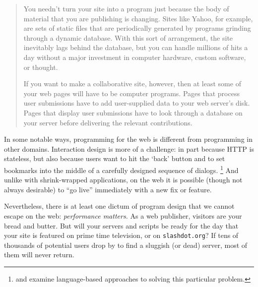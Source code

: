 \documentclass[preprint]{acm_proc_article-sp}
\begin{document}
\begin{quote}
  You needn’t turn your site into a program just because the
  body of material that you are publishing is changing.
  Sites like Yahoo, for example, are sets of static files
  that are periodically generated by programs grinding
  through a dynamic database.  With this sort of
  arrangement, the site inevitably lags behind the database,
  but you can handle millions of hits a day without a major
  investment in computer hardware, custom software, or
  thought.\par If you want to make a collaborative site,
  however, then at least some of your web pages will have to
  be computer programs.  Pages that process user submissions
  have to add user-supplied data to your web server’s disk.
  Pages that display user submissions have to look through a
  database on your server before delivering the relevant
  contributions.~\cite[page 271]{greenspun99panda}
\end{quote}

In some notable ways, programming for the web is different
from programming in other domains.  Interaction design is
more of a challenge: in part because HTTP is stateless, but
also because users want to hit the `back' button and to set
bookmarks into the middle of
a carefully designed sequence of dialogs.%
\footnote{\citet{queinnec00influence} and
  \citet{graunke01programming} examine language-based
  approaches to solving this particular
  problem.} %
And unlike with shrink-wrapped applications, on the web it
is possible (though not always desirable) to ``go live''
immediately with a new fix or feature.

Nevertheless, there is at least one dictum of program design
that we cannot escape on the web: \emph{performance
  matters.}  As a web publisher, visitors are your bread and
butter.  But will your servers and scripts be ready for the
day that your site is featured on prime time television, or
on \texttt{slashdot.org}?  If tens of thousands of potential
users drop by to find a sluggish (or dead) server, most of
them will never return.
\end{document}
